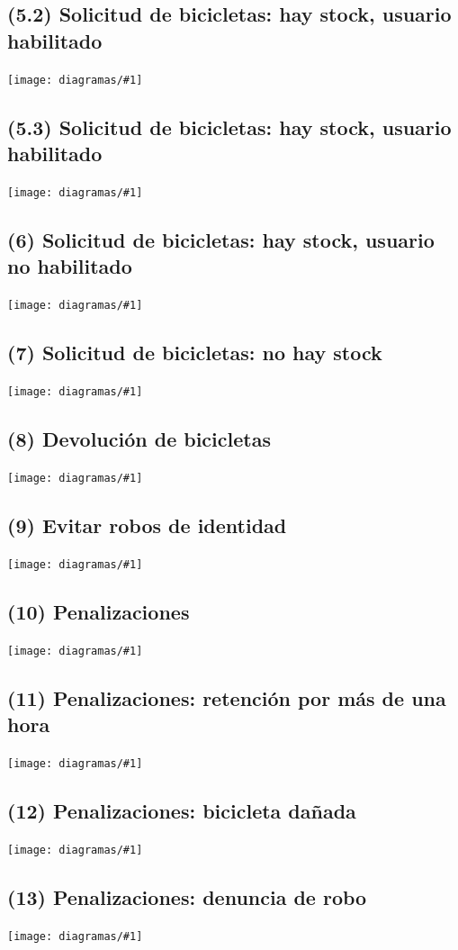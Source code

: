 \documentclass[a4paper, 10pt, twoside]{article}
\newcommand{\diagramav}[1]{
  \texttt{[image: diagramas/\#1]}
}
\newcommand{\diagramah}[1]{
  \texttt{[image: diagramas/\#1]}
}
\begin{document}
\subsection{(5.2)  Solicitud de bicicletas: hay stock, usuario habilitado}
\diagramah{objetivos-5.2}

\subsection{(5.3)  Solicitud de bicicletas: hay stock, usuario habilitado}
\diagramah{objetivos-5.3}

\subsection{(6)    Solicitud de bicicletas: hay stock, usuario no habilitado}
\diagramav{objetivos-6}

\subsection{(7)    Solicitud de bicicletas: no hay stock}
\diagramav{objetivos-7}

\subsection{(8)    Devolución de bicicletas}
\diagramah{objetivos-8}

\subsection{(9)    Evitar robos de identidad}
\diagramav{objetivos-9}

\subsection{(10)   Penalizaciones}
\diagramah{objetivos-10}

\subsection{(11)   Penalizaciones: retención por más de una hora}
\diagramah{objetivos-11}

\subsection{(12)   Penalizaciones: bicicleta dañada}
\diagramah{objetivos-12}

\subsection{(13)   Penalizaciones: denuncia de robo}
\diagramah{objetivos-13}
\end{document}
